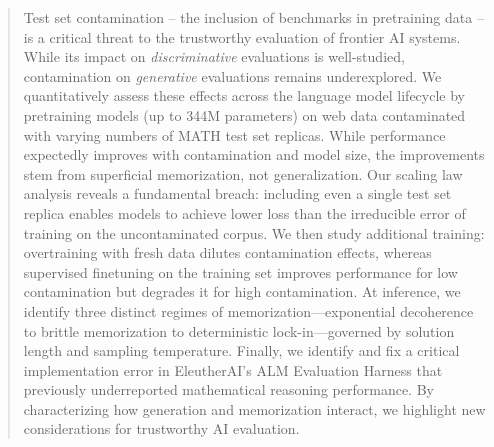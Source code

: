\documentclass{article}
\theoremstyle{plain}
\theoremstyle{definition}
\theoremstyle{remark}
\begin{document}


\printAffiliationsAndNotice{}  %

\begin{abstract}
    Test set contamination -- the inclusion of benchmarks in pretraining data -- is a critical threat to the trustworthy evaluation of frontier AI systems.
    While its impact on \emph{discriminative} evaluations is well-studied, contamination on \emph{generative} evaluations remains underexplored.
    We quantitatively assess these effects across the language model lifecycle by pretraining models (up to 344M parameters) on web data contaminated with varying numbers of MATH test set replicas.
    While performance expectedly improves with contamination and model size, the improvements stem from superficial memorization, not generalization.
    Our scaling law analysis reveals a fundamental breach: including even a single test set replica enables models to achieve lower loss than the irreducible error of training on the uncontaminated corpus.
    We then study additional training: overtraining with fresh data dilutes contamination effects, whereas supervised finetuning on the training set improves performance for low contamination but degrades it for high contamination.
    At inference, we identify three distinct regimes of memorization—exponential decoherence to brittle memorization to deterministic lock-in—governed by solution length and sampling temperature.
    Finally, we identify and fix a critical implementation error in EleutherAI's ALM Evaluation Harness that previously underreported mathematical reasoning performance. By characterizing how generation and memorization interact, we highlight new considerations for trustworthy AI evaluation.
\end{abstract}









\clearpage

\clearpage





\clearpage
\appendix
\onecolumn

\end{document}
